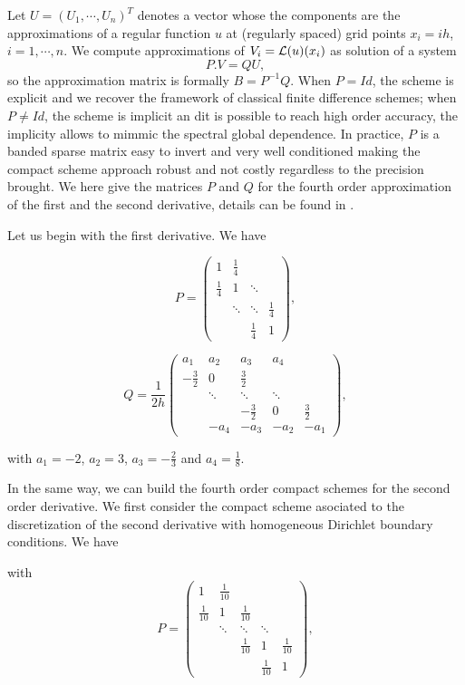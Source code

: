 {Let $U=(U_1,\cdots,U_n)^T$ denotes a vector whose the components are the approximations of a regular function $u$ at (regularly spaced) grid points $x_i=ih$, $i=1,\cdots, n$.  We compute approximations of $V_i={\cal L}(u)(x_i)$ as solution of a system
$$
P . V= Q U,
$$
so the approximation matrix is formally $B=P^{-1}Q$.
When $P=Id$, the scheme is explicit and we recover the framework of classical finite difference schemes;  when $P\neq Id$, the scheme is implicit an dit is possible to reach high order accuracy, the implicity allows to mimmic the spectral global dependence. In practice, $P$ is a banded sparse matrix easy to invert and very well conditioned making the compact scheme approach robust and not costly regardless to the precision brought.
We here give the matrices $P$ and $Q$ for the fourth order approximation of the first and the second derivative, details can be found in \cite{Lele}.

Let us begin with the first derivative. We have

$$P=\begin{pmatrix}
1 & \frac{1}{4} &   &   \\ 
\frac{1}{4} & 1 & \ddots &   \\ 
  & \ddots & \ddots & \frac{1}{4} \\ 
  &   & \frac{1}{4} & 1
\end{pmatrix}, $$

$$Q=\dfrac{1}{2h} \begin{pmatrix}
a_1 & a_2 & a_3 & a_4 &   \\ 
-\frac{3}{2} & 0 & \frac{3}{2} &   &   \\ 
  & \ddots & \ddots & \ddots &   \\ 
  &   & -\frac{3}{2} & 0 & \frac{3}{2} \\ 
  & -a_4 & -a_3 & -a_2 & -a_1
\end{pmatrix}, $$

with $a_1=-2$, $a_2=3$, $a_3=-\frac{2}{3}$ and $a_4=\frac{1}{8}$.


In the same way, we can build the fourth order compact schemes for the second order derivative. We first
consider the compact scheme asociated to the discretization of the second derivative with homogeneous Dirichlet boundary conditions. We have


with
$$ P= \begin{pmatrix}
1 & \frac{1}{10} &   &   &   \\ 
\frac{1}{10} & 1 & \frac{1}{10} &   &   \\ 
  & \ddots & \ddots & \ddots &   \\ 
  &  & \frac{1}{10} & 1 & \frac{1}{10} \\ 
 &  &  & \frac{1}{10} & 1
\end{pmatrix}, $$ 


}
